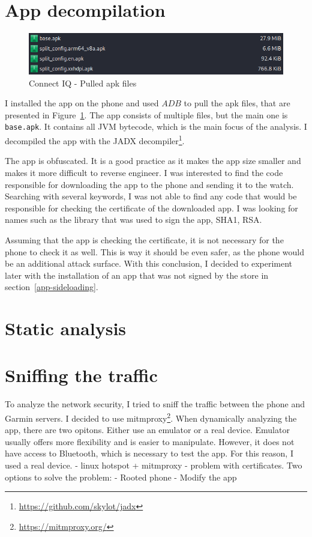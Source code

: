 \section{App decompilation}
\begin{figure}[h]
    \centering
    \includegraphics[width=0.7\linewidth]{../../images/connect-iq-apks}
    \caption{Connect IQ - Pulled apk files}
    \label{fig:connect-iq-apks}
\end{figure}
I installed the app on the phone and used $ADB$ to pull the apk files, that are presented in Figure~\ref{fig:connect-iq-apks}.
The app consists of multiple files, but the main one is \texttt{base.apk}.
It contains all JVM bytecode, which is the main focus of the analysis.
I decompiled the app with the JADX decompiler\footnote{\url{https://github.com/skylot/jadx}}.

The app is obfuscated.
It is a good practice as it makes the app size smaller and makes it more difficult to reverse engineer.
I was interested to find the code responsible for downloading the app to the phone and sending it to the watch.
Searching with several keywords, I was not able to find any code that would be responsible for checking the certificate of the downloaded app.
I was looking for names such as the library that was used to sign the app, SHA1, RSA\@.

Assuming that the app is checking the certificate, it is not necessary for the phone to check it as well.
This is way it should be even safer, as the phone would be an additional attack surface.
With this conclusion, I decided to experiment later with the installation of an app that was not signed by the store in section~\ref{app-sideloading}.
\section{Static analysis}

\section{Sniffing the traffic}
To analyze the network security, I tried to sniff the traffic between the phone and Garmin servers.
I decided to use mitmproxy\footnote{\url{https://mitmproxy.org/}}.
When dynamically analyzing the app, there are two opitons.
Either use an emulator or a real device.
Emulator usually offers more flexibility and is easier to manipulate.
However, it does not have access to Bluetooth, which is necessary to test the app.
For this reason, I used a real device.
- linux hotspot + mitmproxy - problem with certificates.
Two options to solve the problem:
- Rooted phone
- Modify the app

